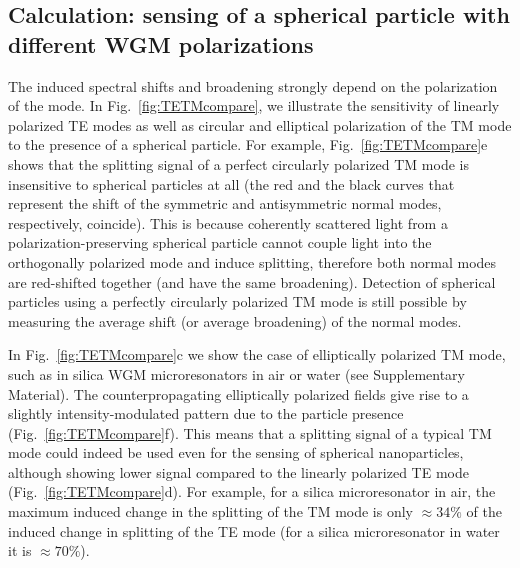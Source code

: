 \documentclass[journal=jacsat,manuscript=article]{achemso}
\begin{document}
\subsection{Calculation: sensing of a spherical particle with different WGM polarizations}

The induced spectral shifts and broadening strongly depend on the polarization of the mode.  In Fig.~\ref{fig:TETMcompare}, we illustrate the sensitivity of linearly polarized TE modes as well as circular and elliptical polarization of the TM mode to the presence of a spherical particle. For example, Fig.~\ref{fig:TETMcompare}e shows that the splitting signal of a perfect circularly polarized TM mode is insensitive to spherical particles at all (the red and the black curves that represent the shift of the symmetric and antisymmetric normal modes, respectively, coincide). This is because coherently scattered light from a polarization-preserving spherical particle cannot couple light into the orthogonally polarized mode and induce splitting, therefore both normal modes are red-shifted together (and have the same broadening). Detection of spherical particles using a perfectly circularly polarized TM mode is still possible by measuring the average shift (or average broadening) of the normal modes.

In Fig.~\ref{fig:TETMcompare}c we show the case of elliptically polarized TM mode, such as in silica WGM microresonators in air or water (see Supplementary Material). The counterpropagating elliptically polarized fields give rise to a slightly intensity-modulated pattern due to the particle presence (Fig.~\ref{fig:TETMcompare}f). This means that a splitting signal of a typical TM mode could indeed be used even for the sensing of spherical nanoparticles, although showing lower signal compared to the linearly polarized TE mode (Fig.~\ref{fig:TETMcompare}d). For example, for a silica microresonator in air, the maximum induced change in the splitting of the TM mode is only $\approx 34\%$ of the induced change in splitting of the TE mode (for a silica microresonator in water it is $\approx 70 \%$).
\end{document}
